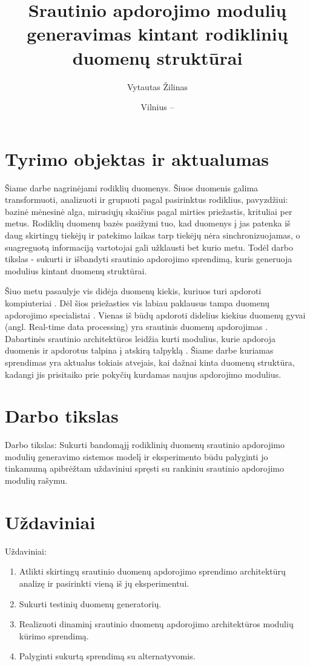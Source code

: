 \documentclass{VUMIFPSbakalaurinis}
\title{Srautinio apdorojimo modulių generavimas kintant rodiklinių duomenų struktūrai}
\author{Vytautas Žilinas}
\date{Vilnius – \the\year}
\begin{document}
 
\maketitle

\cleardoublepage{}
\setcounter{page}{2}

\section{Tyrimo objektas ir aktualumas}
Šiame darbe nagrinėjami rodiklių duomenys. Šiuos duomenis galima transformuoti, analizuoti ir grupuoti pagal pasirinktus rodiklius, 
pavyzdžiui: bazinė mėnesinė alga, mirusiųjų skaičius pagal mirties priežastis, krituliai per metus. 
Rodiklių duomenų bazės pasižymi tuo, kad duomenys į jas patenka iš daug skirtingų tiekėjų ir patekimo laikas tarp tiekėjų nėra 
sinchronizuojamas, o suagreguotą informaciją vartotojai gali užklausti bet kurio metu. Todėl darbo tikslas - sukurti ir išbandyti 
srautinio apdorojimo sprendimą, kuris generuoja modulius kintant duomenų struktūrai. \par
Šiuo metu pasaulyje vis didėja duomenų kiekis, kuriuos turi apdoroti kompiuteriai \cite{DataTrend}. 
Dėl šios priežasties vis labiau paklausus tampa duomenų apdorojimo specialistai \cite{IBMprediction}. 
Vienas iš būdų apdoroti didelius kiekius duomenų gyvai (angl. Real-time data processing) yra srautinis duomenų apdorojimas \cite{BigData, StreamProcessingInData}. 
Dabartinės srautinio architektūros leidžia kurti modulius, kurie apdoroja duomenis ir apdorotus talpina į atskirą talpyklą \cite{8Requirements}. 
Šiame darbe kuriamas sprendimas yra aktualus tokiais atvejais, kai dažnai kinta duomenų struktūra, kadangi jis prisitaiko prie pokyčių kurdamas naujus apdorojimo modulius.

\section{Darbo tikslas}
Darbo tikslas: Sukurti bandomąjį rodiklinių duomenų srautinio apdorojimo modulių 
generavimo sistemos modelį ir eksperimento būdu palyginti jo tinkamumą apibrėžtam 
uždaviniui spręsti su rankiniu srautinio apdorojimo modulių rašymu.

\section{Uždaviniai}
Uždaviniai:
\begin{enumerate}
  \item Atlikti skirtingų srautinio duomenų apdorojimo sprendimo architektūrų analizę ir pasirinkti vieną iš jų eksperimentui.
  \item Sukurti testinių duomenų generatorių.
  \item Realizuoti dinaminį srautinio duomenų apdorojimo architektūros modulių kūrimo sprendimą.
	\item Palyginti sukurtą sprendimą su alternatyvomis.
\end{enumerate}
\end{document}
